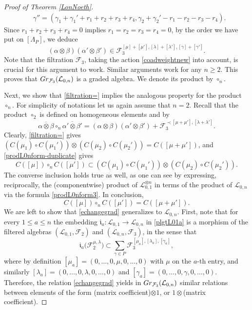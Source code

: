 \documentclass[11pt]{article}
\numberwithin{equation}{section}
\numberwithin{equation}{section}
\theoremstyle{definition}
\newcommand{\Ff}{{\mathcal F}}
\newcommand{\Ll}{{\mathcal L}}
\newcommand{\ra}{\rightarrow}
\begin{document}
\begin{proof}[Proof of Theorem \ref{LonNoeth}]
\begin{align*}
& \gamma'' = (\gamma_1+\gamma_1'+r_1+r_2+r_3+r_4,\gamma_2+\gamma_2'-r_1-r_2-r_3-r_4).
\end{align*}
Since $r_1+r_2+r_3+r_4=0$ implies $r_1=r_2=r_3=r_4=0$, by the order we have put on $[\Lambda_P]$, we deduce
 \[(\alpha\otimes \beta)(\alpha'\otimes \beta') \in \Ff_3^{[\mu]+[\mu'],[\lambda]+[\lambda'],[\gamma]+[\gamma']}.\]
Note that the filtration $\mathcal{F}_3$, taking the action \eqref{coadweightnew} into account, is crucial for this argument to work. Similar arguments work for any $n\geq 2$. This proves that ${\rm Gr}_{{\mathcal F}_3}({\mathcal L}_{0,n})$ is a graded algebra. We denote its product by $\circ_n$.

Next, we show that \eqref{filtration=} implies the analogous property for the product $\circ_n$. For simplicity of notations let us again assume that $n=2$. Recall that the product $\circ_2$ is defined on homogeneous elements  and  by \[\overline{\alpha\otimes \beta}\circ_n\overline{\alpha'\otimes \beta'} = (\alpha\otimes \beta)(\alpha'\otimes \beta') + {\mathcal F}_3^{\prec [\mu+\mu'],[\lambda+\lambda']}.\]
Clearly, \eqref{filtration=} gives $(C(\mu_1)\circ C(\mu_1'))\otimes (C(\mu_2)\circ C(\mu_2')) = C([\mu + \mu'])$, and \eqref{prodL0nform-duplicate} gives
 \[C([\mu]) \circ_n C([\mu']) \subset (C(\mu_1)\circ C(\mu_1'))\otimes (C(\mu_2)\circ C(\mu_2')).\]
The converse inclusion holds true as well, as one can see by expressing, reciprocally, the (componentwise) product of $\Ll_{0,1}^{\otimes n}$ in terms of the product of $\Ll_{0,n}$ via the formula \eqref{prodL0nform3}. In conclusion,%
\[%
C([\mu]) \circ_n C([\mu']) = C([\mu + \mu']).
\]
We are left to show that \eqref{echangegrad} generalizes to $\Ll_{0,n}$. First, note that for every $1\leq a\leq n$ the embedding $\mathfrak{i}_a\colon \Ll_{0,1}\ra \Ll_{0,n}$ in \eqref{plgtL01a} is a morphism of the filtered algebras $(\Ll_{0,1},\mathcal{F}_2)$ and $(\Ll_{0,n},\mathcal{F}_3)$, in the sense that
\[\mathfrak{i}_a\big({\mathcal F}_2^{\mu,\lambda}\big) \subset \sum_{\gamma \in P} {\mathcal F}_3^{[\mu_a],[\lambda_a],[\gamma_a]},
\]
where by definition $[\mu_a] = (0,\dots,0,\mu,0,\dots,0)$ with $\mu$ on the $a$-th entry, and similarly $[\lambda_a] = (0,\dots,0,\lambda,0,\dots,0)$ and $[\gamma_a] = (0,\dots,0,\gamma,0,\dots,0)$. Therefore, the relation \eqref{echangegrad} yields in ${\rm Gr}_{{\mathcal F}_3}({\mathcal L}_{0,n})$ similar relations between elements of the form (matrix coefficient)$\otimes 1$, or $1 \otimes$(matrix coefficient).


\end{proof}
\end{document}
